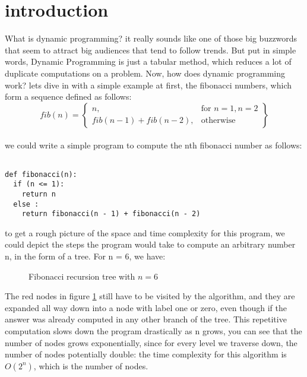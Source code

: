 
 
 \section{introduction}


What is dynamic programming? it really sounds like one of those big buzzwords that seem to
attract big audiences that tend to follow trends. But put in simple words, Dynamic Programming is just a tabular method, 
which reduces a lot of duplicate computations on a problem. Now, how does dynamic programming work? lets dive in with a simple example at first, the fibonacci numbers,
which form a sequence defined as follows:
  \\
  \[
    fib(n) = \left\{\begin{array}{lr}
      n, & \text{for } n = 1, n = 2\\
      fib(n-1) + fib(n-2), & \text{otherwise}
      \end{array}\right\}
  \]
  \\

we could write a simple program to compute the nth fibonacci number as follows:

\begin{verbatim}

def fibonacci(n):
  if (n <= 1):
    return n
  else :
    return fibonacci(n - 1) + fibonacci(n - 2)

\end{verbatim}


to get a rough picture of the space and time complexity for this program, we could depict the steps
the program would take to compute an arbitrary number n, in the form of a tree. For n = 6, we have:


\begin{figure}[ht]
  \centering
  \caption{Fibonacci recursion tree with $n = 6$}
  \label{fig:fib1}
\end{figure}

The red nodes in figure \ref{fig:fib1} still have to be visited by the algorithm, and they are expanded all 
way down into a node with label one or zero, even though if the answer was already computed in any other 
branch of the tree. This repetitive computation slows down the program drastically as n grows,
you can see that the number of nodes grows exponentially, since for every level we traverse down,
the number of nodes potentially double: the time complexity for this algorithm is $O(2^n)$, which is 
the number of nodes.

